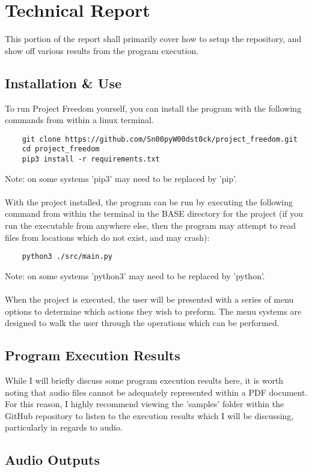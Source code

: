 \documentclass[notitlepage]{article}
\begin{document}
\section{Technical Report}

This portion of the report shall primarily cover how to setup the repository,
and show off various results from the program execution.

\subsection{Installation \& Use}
To run Project Freedom yourself, you can install the program with the following commands
from within a linux terminal.
\begin{lstlisting}
    git clone https://github.com/Sn00pyW00dst0ck/project_freedom.git
    cd project_freedom
    pip3 install -r requirements.txt
\end{lstlisting}
Note: on some systems 'pip3' may need to be replaced by 'pip'.
\\\\
With the project installed, the program can be run by executing the
following command from within the terminal in the BASE directory for
the project (if you run the executable from anywhere else, then the
program may attempt to read files from locations which do not exist,
and may crash):
\begin{lstlisting}
    python3 ./src/main.py
\end{lstlisting}
Note: on some systems 'python3' may need to be replaced by 'python'.
\\\\
When the project is executed, the user will be presented with a series of
menu options to determine which actions they wish to preform. The menu systems
are designed to walk the user through the operations which can be performed.

\subsection{Program Execution Results}

While I will briefly discuss some program execution results here, it is worth
noting that audio files cannot be adequately represented within a PDF document.
For this reason, I highly recommend viewing the 'samples' folder within the GitHub
repository to listen to the execution results which I will be discussing, particularly
in regards to audio.

\subsection{Audio Outputs}
\end{document}
